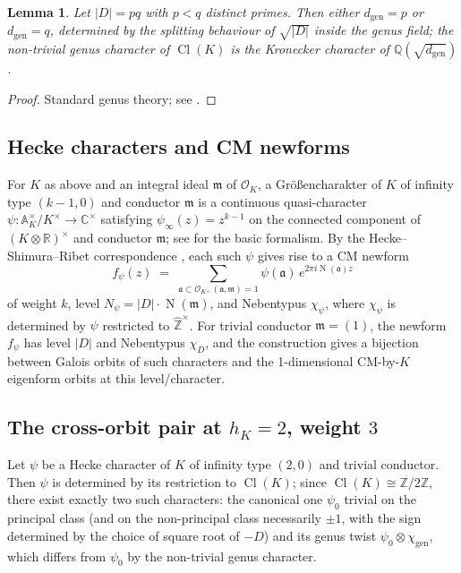 \documentclass[11pt]{amsart}
\newtheorem{lemma}[theorem]{Lemma}
\theoremstyle{definition}
\theoremstyle{remark}
\DeclareMathOperator{\Cl}{Cl}
\DeclareMathOperator{\Nm}{N}
\newcommand{\Q}{\mathbb{Q}}
\newcommand{\Z}{\mathbb{Z}}
\newcommand{\C}{\mathbb{C}}
\newcommand{\R}{\mathbb{R}}
\newcommand{\OK}{\mathcal{O}_K}
\newcommand{\chiD}{\chi_D}
\begin{document}
\begin{lemma}\label{lem:genus-field}
Let \(|D| = pq\) with \(p < q\) distinct primes. Then either
\(d_{\mathrm{gen}} = p\) or \(d_{\mathrm{gen}} = q\), determined by
the splitting behaviour of \(\sqrt{|D|}\) inside the genus field;
the non-trivial genus character of \(\Cl(K)\) is the Kronecker
character of \(\Q(\sqrt{d_{\mathrm{gen}}})\).
\end{lemma}

\begin{proof}
Standard genus theory; see \cite[Ch.~6]{Cox1989}.
\end{proof}

\subsection{Hecke characters and CM newforms}

For \(K\) as above and an integral ideal \(\mathfrak{m}\) of \(\OK\),
a Gr\"o\ss encharakter of \(K\) of infinity type \((k - 1, 0)\) and
conductor \(\mathfrak{m}\) is a continuous quasi-character
\(\psi \colon \mathbb{A}_{K}^{\times}/K^{\times} \to \C^{\times}\)
satisfying \(\psi_{\infty}(z) = z^{k - 1}\) on the connected
component of \((K \otimes \R)^{\times}\) and conductor
\(\mathfrak{m}\); see \cite[Ch.~3]{Miyake2006} for the basic
formalism. By the Hecke--Shimura--Ribet correspondence
\cite{Hecke1936,Shimura1971,Ribet1977}, each such \(\psi\) gives rise
to a CM newform
\[
   f_{\psi}(z)
   \;=\; \sum_{\mathfrak{a} \subset \OK,\, (\mathfrak{a}, \mathfrak{m}) = 1}
         \psi(\mathfrak{a})\, e^{2\pi i \Nm(\mathfrak{a}) z}
\]
of weight \(k\), level \(N_{\psi} = |D| \cdot \Nm(\mathfrak{m})\),
and Nebentypus \(\chi_{\psi}\), where \(\chi_{\psi}\) is determined
by \(\psi\) restricted to \(\widehat{\Z}^{\times}\). For trivial
conductor \(\mathfrak{m} = (1)\), the newform \(f_{\psi}\) has level
\(|D|\) and Nebentypus \(\chiD\), and the construction gives a
bijection between Galois orbits of such characters and the
1-dimensional CM-by-\(K\) eigenform orbits at this level/character.

\subsection{The cross-orbit pair at \(h_{K} = 2\), weight \(3\)}

Let \(\psi\) be a Hecke character of \(K\) of infinity type
\((2, 0)\) and trivial conductor. Then \(\psi\) is determined by its
restriction to \(\Cl(K)\); since \(\Cl(K) \cong \Z/2\Z\), there
exist exactly two such characters: the canonical one \(\psi_{0}\)
trivial on the principal class (and on the non-principal class
necessarily \(\pm 1\), with the sign determined by the choice of
square root of \(-D\)) and its genus twist
\(\psi_{0} \otimes \chi_{\mathrm{gen}}\), which differs from
\(\psi_{0}\) by the non-trivial genus character.
\end{document}
